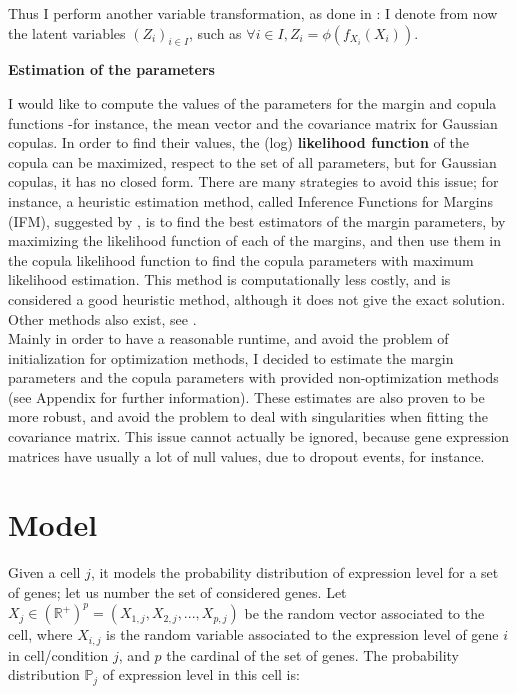 \documentclass{report}
\begin{document}
{Thus I perform another variable transformation, as done in \cite{zhang2017classification}: I denote from now the latent variables $(Z_i)_{i \in I}$, such as $\forall i \in I, Z_i = \phi(f_{X_i}(X_i))$. 

\bigskip
\noindent \textbf{Estimation of the parameters}
\bigskip

I would like to compute the values of the parameters for the margin and copula functions -for instance, the mean vector and the covariance matrix for Gaussian copulas.  In order to find their values, the (log) \textbf{likelihood function} of the copula can be maximized, respect to the set of all parameters, but for Gaussian copulas, it has no closed form. There are many strategies to avoid this issue; for instance, a heuristic estimation method, called Inference Functions for Margins (IFM), suggested by \cite{joe1996estimation}, is to find the best estimators of the margin parameters, by maximizing the likelihood function of each of the margins, and then use them in the copula likelihood function to find the copula parameters with maximum likelihood estimation. This method is computationally less costly, and is considered a good heuristic method\cite{bouye2000copulas}, although it does not give the exact solution. Other methods also exist, see \cite{yan2007enjoy}.\\

Mainly in order to have a reasonable runtime, and avoid the problem of initialization for optimization methods, I decided to estimate the margin parameters and the copula parameters with provided non-optimization methods\cite{yu2013shrinkage}\cite{schafer2005shrinkage} (see Appendix for further information). These estimates are also proven to be more robust, and avoid the problem to deal with singularities when fitting the covariance matrix. This issue cannot actually be ignored, because gene expression matrices have usually a lot of null values, due to dropout events, for instance.\\

\section{Model}

Given a cell $j$, it models the probability distribution of expression level for a set of genes; let us number the set of considered genes. Let $X_j \in (\mathbb{R}^{+})^{p} = (X_{1,j}, X_{2,j}, ..., X_{p,j})$ be the random vector associated to the cell, where $X_{i,j}$ is the random variable associated to the expression level of gene $i$ in cell/condition $j$, and $p$ the cardinal of the set of genes. The probability distribution $\mathbb{P}_j$ of expression level in this cell is:

}
\end{document}
